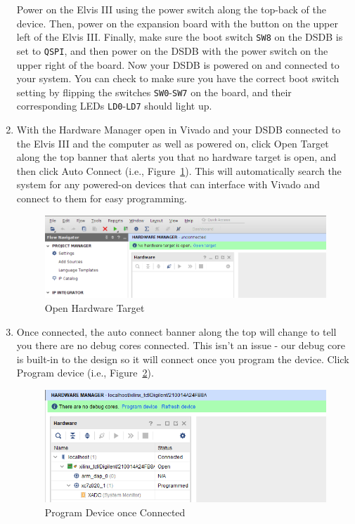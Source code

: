 \documentclass{article}
\begin{document}
\begin{enumerate}
Power on the Elvis III using the power switch along the top-back of the device.
Then, power on the expansion board with the button on the upper left of the
Elvis III.  Finally, make sure the boot switch \verb|SW8| on the DSDB is set to
\verb|QSPI|, and then power on the DSDB with the power switch on the upper
right of the board.  Now your DSDB is powered on and connected to your system.
You can check to make sure you have the correct boot switch setting by flipping
the switches \verb|SW0|-\verb|SW7| on the board, and their corresponding LEDs
\verb|LD0|-\verb|LD7| should light up.

\item With the Hardware Manager open in Vivado and your DSDB connected to the
Elvis III and the computer as well as powered on, click Open Target along the
top banner that alerts you that no hardware target is open, and then click Auto
Connect (i.e., Figure~\ref{fig:opentarget}).  This will automatically search the
system for any powered-on devices that can interface with Vivado and connect to
them for easy programming.
\begin{figure}[h!]
	\centering
	\includegraphics[width=0.8\linewidth]{open_target}
	\caption{Open Hardware Target}
	\label{fig:opentarget}
\end{figure}

\item Once connected, the auto connect banner along the top will change to tell
you there are no debug cores connected.  This isn't an issue - our debug core is
built-in to the design so it will connect once you program the device.  Click
Program device (i.e., Figure~\ref{fig:programdevice}).
\begin{figure}[h!]
	\centering
	\includegraphics[width=0.8\linewidth]{program_device}
	\caption{Program Device once Connected}
	\label{fig:programdevice}
\end{figure}


\end{enumerate}
\end{document}

